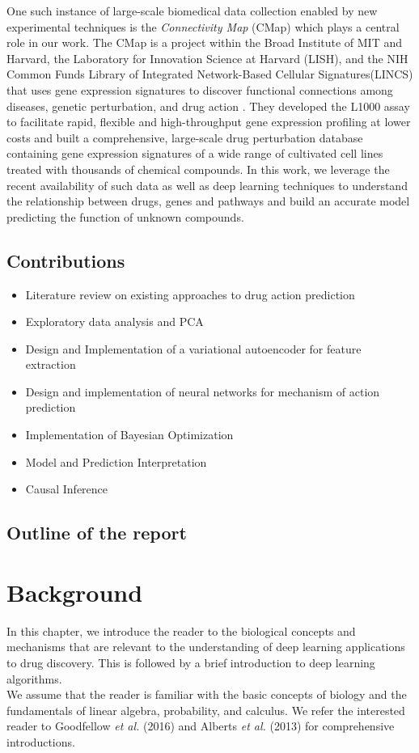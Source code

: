 \documentclass[bsc,frontabs,twoside,singlespacing,parskip,deptreport]{infthesis}     %
\begin{document}
One such instance of large-scale biomedical data collection enabled by new experimental techniques is the \textit{Connectivity Map} (CMap) \cite{lamb_connectivity_2006} which plays a central role in our work. The CMap is a project within the Broad Institute of MIT and Harvard, the Laboratory for Innovation Science at Harvard (LISH), and the  NIH  Common  Funds  Library  of  Integrated  Network-Based  Cellular  Signatures(LINCS) that uses gene expression signatures to discover functional connections among diseases, genetic perturbation, and drug action \cite{musa_review_2017}. They developed the L1000 assay to facilitate rapid, flexible and high-throughput gene expression profiling at lower costs \cite{subramanian_next_2017} and built a comprehensive, large-scale drug perturbation database containing gene expression signatures of a wide range of cultivated cell lines treated with thousands of chemical compounds. In this work, we leverage the recent availability of such data as well as deep learning techniques to understand the relationship between drugs, genes and pathways and build an accurate model predicting the function of unknown compounds.


\section{Contributions}
\begin{itemize}
\item Literature review on existing approaches to drug action prediction 
\item Exploratory data analysis and PCA
\item Design and Implementation of a variational autoencoder for feature extraction
\item Design and implementation of neural networks for mechanism of action prediction
\item Implementation of Bayesian Optimization
\item Model and Prediction Interpretation
\item Causal Inference
\end{itemize}
\section{Outline of the report}

\chapter{Background}
In this chapter, we introduce the reader to the biological concepts and mechanisms that are relevant to the understanding of deep learning applications to drug discovery. This is followed by a brief introduction to deep learning algorithms. \\
We assume that the reader is familiar with the basic concepts of biology and the fundamentals of linear algebra, probability, and calculus. We refer the interested reader to Goodfellow \textit{et al.} (2016) \cite{goodfellow_deep_2016} and Alberts \textit{et al.} (2013) \cite{alberts_essential_2013} for comprehensive introductions.
\end{document}
